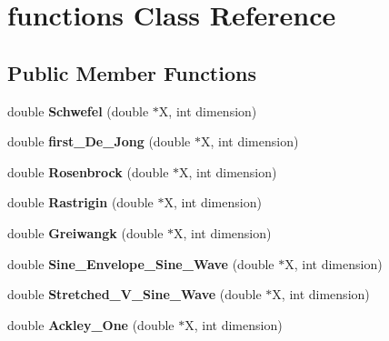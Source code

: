 \hypertarget{classfunctions}{}\section{functions Class Reference}
\label{classfunctions}
\subsection*{Public Member Functions}
\begin{DoxyCompactItemize}
\item 
\mbox{\label{classfunctions_a59d4f9b51d03aff9430f007b8f893b5f}} 
double {\bfseries Schwefel} (double $\ast$X, int dimension)
\item 
\mbox{\label{classfunctions_a6ddf75354f9ca0010c9ddea19ca92de3}} 
double {\bfseries first\+\_\+\+De\+\_\+\+Jong} (double $\ast$X, int dimension)
\item 
\mbox{\label{classfunctions_a5ab758a8c38bd1534ac4707aacbd2419}} 
double {\bfseries Rosenbrock} (double $\ast$X, int dimension)
\item 
\mbox{\label{classfunctions_a4983edb28661e12819504c2581864a82}} 
double {\bfseries Rastrigin} (double $\ast$X, int dimension)
\item 
\mbox{\label{classfunctions_a4c96efc6ecea54ef50afb0e573b3a625}} 
double {\bfseries Greiwangk} (double $\ast$X, int dimension)
\item 
\mbox{\label{classfunctions_ae2733cb192999167dd71011f7dc78cb9}} 
double {\bfseries Sine\+\_\+\+Envelope\+\_\+\+Sine\+\_\+\+Wave} (double $\ast$X, int dimension)
\item 
\mbox{\label{classfunctions_a81c44d882b949246a234559de5ab5860}} 
double {\bfseries Stretched\+\_\+\+V\+\_\+\+Sine\+\_\+\+Wave} (double $\ast$X, int dimension)
\item 
\mbox{\label{classfunctions_ad3c2ad5a58d1adaaf1ddacf914df5dd6}} 
double {\bfseries Ackley\+\_\+\+One} (double $\ast$X, int dimension)
\item 
\mbox{\label{classfunctions_adc0ac2a3c4080ecc88c1ce0bbc584e0d}} 

\end{DoxyCompactItemize}

